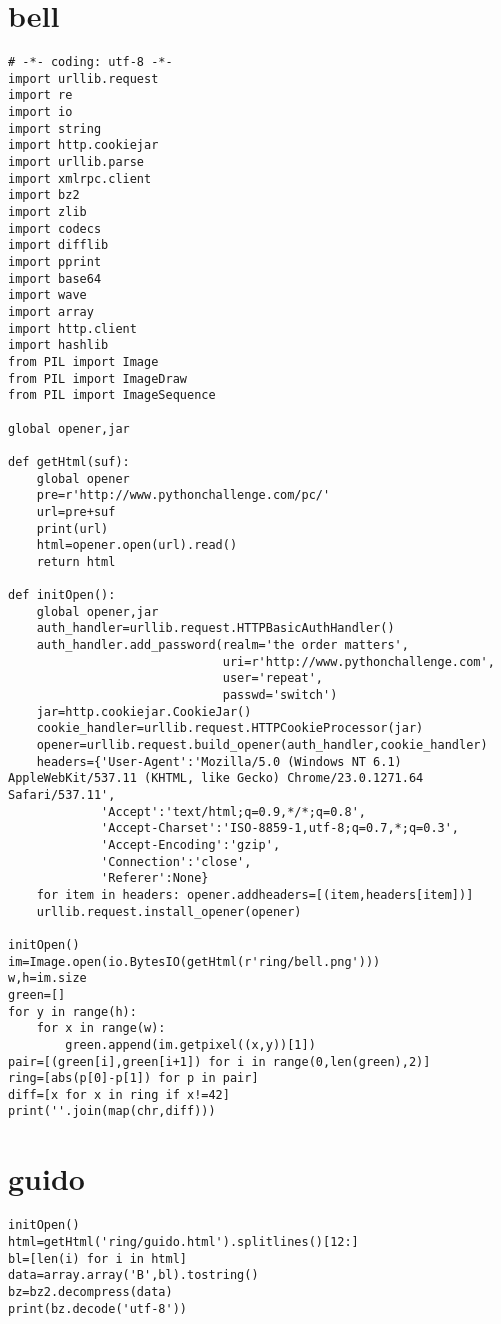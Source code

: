 \documentclass[onecolumn,a4paper,12pt]{article}
\begin{document}
\section{bell}
\begin{lstlisting}
# -*- coding: utf-8 -*-
import urllib.request
import re
import io
import string
import http.cookiejar
import urllib.parse
import xmlrpc.client
import bz2
import zlib
import codecs
import difflib
import pprint
import base64
import wave
import array
import http.client
import hashlib
from PIL import Image
from PIL import ImageDraw
from PIL import ImageSequence

global opener,jar

def getHtml(suf):
    global opener
    pre=r'http://www.pythonchallenge.com/pc/'
    url=pre+suf
    print(url)
    html=opener.open(url).read()
    return html

def initOpen():
    global opener,jar
    auth_handler=urllib.request.HTTPBasicAuthHandler()
    auth_handler.add_password(realm='the order matters',
                              uri=r'http://www.pythonchallenge.com',
                              user='repeat',
                              passwd='switch')
    jar=http.cookiejar.CookieJar()
    cookie_handler=urllib.request.HTTPCookieProcessor(jar)
    opener=urllib.request.build_opener(auth_handler,cookie_handler)
    headers={'User-Agent':'Mozilla/5.0 (Windows NT 6.1) AppleWebKit/537.11 (KHTML, like Gecko) Chrome/23.0.1271.64 Safari/537.11',
             'Accept':'text/html;q=0.9,*/*;q=0.8',
             'Accept-Charset':'ISO-8859-1,utf-8;q=0.7,*;q=0.3',
             'Accept-Encoding':'gzip',
             'Connection':'close',
             'Referer':None}
    for item in headers: opener.addheaders=[(item,headers[item])]
    urllib.request.install_opener(opener)

initOpen()
im=Image.open(io.BytesIO(getHtml(r'ring/bell.png')))
w,h=im.size
green=[]
for y in range(h):
    for x in range(w):
        green.append(im.getpixel((x,y))[1])
pair=[(green[i],green[i+1]) for i in range(0,len(green),2)]
ring=[abs(p[0]-p[1]) for p in pair]
diff=[x for x in ring if x!=42]
print(''.join(map(chr,diff)))
\end{lstlisting}

\section{guido}
\begin{lstlisting}
initOpen()
html=getHtml('ring/guido.html').splitlines()[12:]
bl=[len(i) for i in html]
data=array.array('B',bl).tostring()
bz=bz2.decompress(data)
print(bz.decode('utf-8'))
\end{lstlisting}
\end{document}
